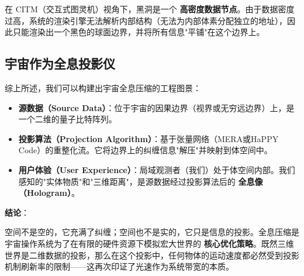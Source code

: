 在 CITM（交互式图灵机）视角下，黑洞是一个 \textbf{高密度数据节点}。由于数据密度过高，系统的渲染引擎无法解析内部结构（无法为内部体素分配独立的地址），因此只能渲染出一个黑色的球面边界，并将所有信息"平铺"在这个边界上。

\subsection{宇宙作为全息投影仪}

综上所述，我们可以构建出宇宙全息压缩的工程图景：

\begin{itemize}
\item \textbf{源数据（Source Data）}：位于宇宙的因果边界（视界或无穷远边界）上，是一个二维的量子比特阵列。

\item \textbf{投影算法（Projection Algorithm）}：基于张量网络（MERA或HaPPY Code）的重整化流。它将边界上的纠缠信息"解压"并映射到体空间中。

\item \textbf{用户体验（User Experience）}：局域观测者（我们）处于体空间内部。我们感知的"实体物质"和"三维距离"，是源数据经过投影算法后的 \textbf{全息像（Hologram）}。
\end{itemize}

\textbf{结论}：

空间不是空的，它充满了纠缠；空间也不是实的，它只是信息的投影。全息压缩是宇宙操作系统为了在有限的硬件资源下模拟宏大世界的 \textbf{核心优化策略}。既然三维世界是二维数据的投影，那么在这个投影中，任何物体的运动速度都必然受到投影机制刷新率的限制——这再次印证了光速作为系统带宽的本质。
